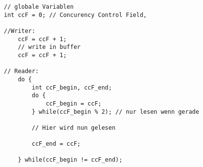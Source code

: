 \lstset{language=c} 
\begin{lstlisting}[breaklines,showstringspaces=false,frame=none] 
// globale Variablen
int ccF = 0; // Concurency Control Field, 

//Writer:
	ccF = ccF + 1;
	// write in buffer
	ccF = ccF + 1; 

// Reader:
	do {
		int ccF_begin, ccF_end;
		do {
			ccF_begin = ccF;
		} while(ccF_begin % 2); // nur lesen wenn gerade

		// Hier wird nun gelesen

		ccF_end = ccF;

	} while(ccF_begin != ccF_end);

\end{lstlisting}